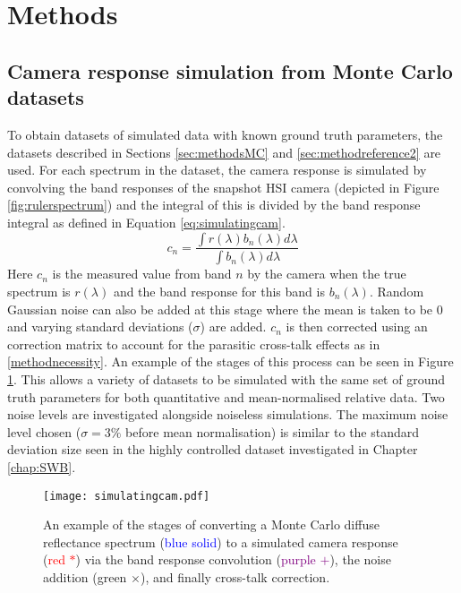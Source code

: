 \section{Methods}
\subsection{Camera response simulation from Monte Carlo datasets}\label{sec:MCcameras}
To obtain datasets of simulated data with known ground truth parameters, the datasets described in Sections \ref{sec:methodsMC} and \ref{sec:methodreference2} are used. For each spectrum in the dataset, the camera response is simulated by convolving the band responses of the snapshot HSI camera (depicted in Figure \ref{fig:rulerspectrum}) and the integral of this is divided by the band response integral as defined in Equation \ref{eq:simulatingcam}. 
\begin{equation}
	c_{n} = \frac{\int r(\lambda)b_n(\lambda) d\lambda}{\int b_n(\lambda) d\lambda}
\label{eq:simulatingcam}
\end{equation}
Here $c_n$ is the measured value from band $n$ by the camera when the true spectrum is $r(\lambda)$ and the band response for this band is $b_n(\lambda)$. Random Gaussian noise can also be added at this stage where the mean is taken to be 0 and varying standard deviations ($\sigma$) are added. $c_n$ is then corrected using an correction matrix to account for the parasitic cross-talk effects as in \ref{methodnecessity}. An example of the stages of this process can be seen in Figure \ref{fig:simulatingcam}. This allows a variety of datasets to be simulated with the same set of ground truth parameters for both quantitative and mean-normalised relative data. Two noise levels are investigated alongside noiseless simulations. The maximum noise level chosen ($\sigma = 3\%$ before mean normalisation) is similar to the standard deviation size seen in the highly controlled dataset investigated in Chapter \ref{chap:SWB}.  
\begin{figure}[h!]
    \centering 
    \texttt{[image: simulatingcam.pdf]}
    \caption{An example of the stages of converting a Monte Carlo diffuse reflectance spectrum (\textcolor{blue}{blue solid}) to a simulated camera response (\textcolor{red}{red $*$}) via the band response convolution (\textcolor{purple}{purple $+$}), the noise addition (\textcolor{MyGreen}{green $\times$}), and finally cross-talk correction.}
    \label{fig:simulatingcam}
\end{figure}

